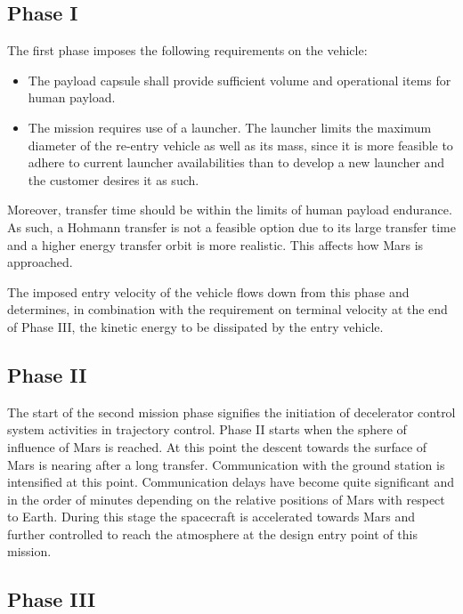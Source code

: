 \subsection{Phase I}\label{sec:p1}
The first phase imposes the following requirements on the vehicle:
\begin{itemize}
\item The payload capsule shall provide sufficient volume and operational items for human payload. %
\item  The mission requires use of a launcher. The launcher limits the maximum diameter of the re-entry vehicle as well as its mass, since it is more feasible to adhere to current launcher availabilities than to develop a new launcher and the customer desires it as such.
\end{itemize}
Moreover, transfer time should be within the limits of human payload endurance. As such, a Hohmann transfer is not a feasible option due to its large transfer time and a higher energy transfer orbit is more realistic. This affects how Mars is approached.

The imposed entry velocity of the vehicle flows down from this phase and determines, in combination with the requirement on terminal velocity at the end of Phase III, the kinetic energy to be dissipated by the entry vehicle.

\subsection{Phase II}\label{sec:p2}
The start of the second mission phase signifies the initiation of decelerator control system activities in trajectory control. Phase II starts when the sphere of influence of Mars is reached.  At this point the descent towards the surface of Mars is nearing after a long transfer. Communication with the ground station is intensified at this point. Communication delays have become quite significant and in the order of minutes depending on the relative positions of Mars with respect to Earth. During this stage the spacecraft is accelerated towards Mars and further controlled to reach the atmosphere at the design entry point of this mission.

\subsection{Phase III}\label{sec:p3}

